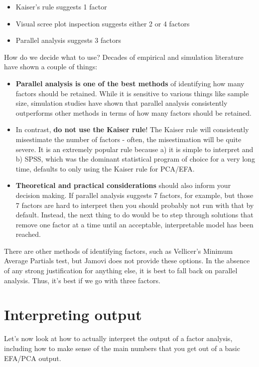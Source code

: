 \documentclass[
]{book}
\providecommand{\tightlist}{%
  \setlength{\itemsep}{0pt}\setlength{\parskip}{0pt}}
\begin{document}
\begin{itemize}
\tightlist
\item
  Kaiser's rule suggests 1 factor
\item
  Visual scree plot inspection suggests either 2 or 4 factors
\item
  Parallel analysis suggests 3 factors
\end{itemize}

How do we decide what to use? Decades of empirical and simulation literature have shown a couple of things:

\begin{itemize}
\tightlist
\item
  \textbf{Parallel analysis is one of the best methods} of identifying how many factors should be retained. While it is sensitive to various things like sample size, simulation studies have shown that parallel analysis consistently outperforms other methods in terms of how many factors should be retained.
\item
  In contrast, \textbf{do not use the Kaiser rule}! The Kaiser rule will consistently misestimate the number of factors - often, the misestimation will be quite severe. It is an extremely popular rule because a) it is simple to interpret and b) SPSS, which was the dominant statistical program of choice for a very long time, defaults to only using the Kaiser rule for PCA/EFA.
\item
  \textbf{Theoretical and practical considerations} should also inform your decision making. If parallel analysis suggests 7 factors, for example, but those 7 factors are hard to interpret then you should probably not run with that by default. Instead, the next thing to do would be to step through solutions that remove one factor at a time until an acceptable, interpretable model has been reached.
\end{itemize}

There are other methods of identifying factors, such as Vellicer's Minimum Average Partials test, but Jamovi does not provide these options. In the absence of any strong justification for anything else, it is best to fall back on parallel analysis. Thus, it's best if we go with three factors.

\section{Interpreting output}\label{interpreting-output}

Let's now look at how to actually interpret the output of a factor analysis, including how to make sense of the main numbers that you get out of a basic EFA/PCA output.
\end{document}
